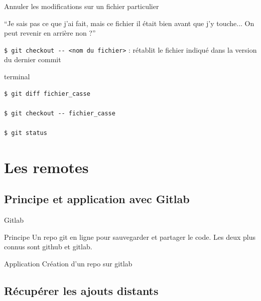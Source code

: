 \documentclass[usepdftitle=false]{beamer}
\begin{document}
\begin{frame}[fragile]{Annuler les modifications sur un fichier particulier}
	\begin{block}{}
		\enquote{Je sais pas ce que j'ai fait, mais ce fichier il était bien avant que j'y touche... On peut revenir en arrière non ?}
	\end{block}

	\verb+$ git checkout -- <nom du fichier>+ : rétablit le fichier indiqué dans la version du dernier commit

	\begin{beamercolorbox}[rounded=true,shadow=true]{terminal}
\begin{Verbatim}
$ git diff fichier_casse

$ git checkout -- fichier_casse

$ git status
\end{Verbatim}
	\end{beamercolorbox}
\end{frame}

\section{Les remotes}

\subsection{Principe et application avec Gitlab}

\begin{frame}{Gitlab}
	\begin{block}{Principe}
		Un repo git en ligne pour sauvegarder et partager le code. Les deux plus connus sont github et gitlab.
	\end{block}
	\begin{block}{Application}
		Création d'un repo sur gitlab
	\end{block}
\end{frame}

\subsection{Récupérer les ajouts distants}
\end{document}
